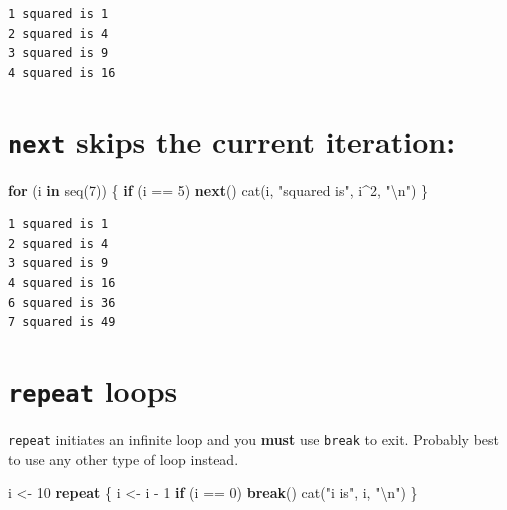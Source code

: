 \documentclass[
]{book}
\newenvironment{Shaded}{\begin{snugshade}}{\end{snugshade}}
\newcommand{\ControlFlowTok}[1]{\textcolor[rgb]{0.13,0.29,0.53}{\textbf{#1}}}
\newcommand{\DecValTok}[1]{\textcolor[rgb]{0.00,0.00,0.81}{#1}}
\newcommand{\FunctionTok}[1]{\textcolor[rgb]{0.00,0.00,0.00}{#1}}
\newcommand{\NormalTok}[1]{#1}
\newcommand{\OtherTok}[1]{\textcolor[rgb]{0.56,0.35,0.01}{#1}}
\newcommand{\SpecialCharTok}[1]{\textcolor[rgb]{0.00,0.00,0.00}{#1}}
\newcommand{\StringTok}[1]{\textcolor[rgb]{0.31,0.60,0.02}{#1}}
\begin{document}
\begin{verbatim}
1 squared is 1 
2 squared is 4 
3 squared is 9 
4 squared is 16 
\end{verbatim}

\hypertarget{next-skips-the-current-iteration}{%
\section{\texorpdfstring{\texttt{next} skips the current iteration:}{next skips the current iteration:}}\label{next-skips-the-current-iteration}}

\begin{Shaded}
\begin{Highlighting}[]
\ControlFlowTok{for}\NormalTok{ (i }\ControlFlowTok{in} \FunctionTok{seq}\NormalTok{(}\DecValTok{7}\NormalTok{)) \{}
  \ControlFlowTok{if}\NormalTok{ (i }\SpecialCharTok{==} \DecValTok{5}\NormalTok{) }\ControlFlowTok{next}\NormalTok{()}
  \FunctionTok{cat}\NormalTok{(i, }\StringTok{"squared is"}\NormalTok{, i}\SpecialCharTok{\^{}}\DecValTok{2}\NormalTok{, }\StringTok{"}\SpecialCharTok{\textbackslash{}n}\StringTok{"}\NormalTok{)}
\NormalTok{\}}
\end{Highlighting}
\end{Shaded}

\begin{verbatim}
1 squared is 1 
2 squared is 4 
3 squared is 9 
4 squared is 16 
6 squared is 36 
7 squared is 49 
\end{verbatim}

\hypertarget{repeat-loops}{%
\section{\texorpdfstring{\texttt{repeat} loops}{repeat loops}}\label{repeat-loops}}

\texttt{repeat} initiates an infinite loop and you \textbf{must} use \texttt{break} to exit. Probably best to use any other type of loop instead.

\begin{Shaded}
\begin{Highlighting}[]
\NormalTok{i }\OtherTok{\textless{}{-}} \DecValTok{10}
\ControlFlowTok{repeat}\NormalTok{ \{}
\NormalTok{ i }\OtherTok{\textless{}{-}}\NormalTok{ i }\SpecialCharTok{{-}} \DecValTok{1}
 \ControlFlowTok{if}\NormalTok{ (i }\SpecialCharTok{==} \DecValTok{0}\NormalTok{) }\ControlFlowTok{break}\NormalTok{()}
 \FunctionTok{cat}\NormalTok{(}\StringTok{"i is"}\NormalTok{, i, }\StringTok{"}\SpecialCharTok{\textbackslash{}n}\StringTok{"}\NormalTok{)}
\NormalTok{\}}
\end{Highlighting}
\end{Shaded}
\end{document}
